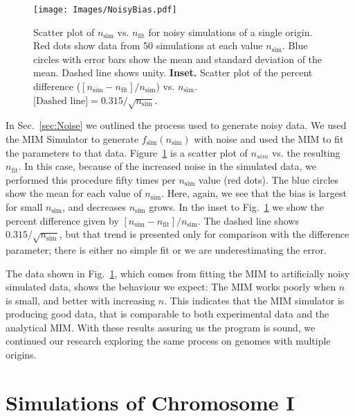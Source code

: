 		\begin{figure}[tbh]
			\begin{center}
				\texttt{[image: Images/NoisyBias.pdf]}
			\end{center}
				\caption[Bias in MIM Fit to Noisy Data]{\label{fig:NoisyBias} Scatter plot of $n_\text{sim}$ vs. $n_\text{fit}$ for noisy simulations of a single origin.
				Red dots show data from 50 simulations at each value $n_\text{sim}$.
				Blue circles with error bars show the mean and standard deviation of the mean.
				Dashed line shows unity.
				\textbf{Inset.} Scatter plot of the percent difference ($[n_\text{sim} - n_\text{fit}]/n_\text{sim}$) vs. $n_\text{sim}$.\\
				$\text{[Dashed line]} = 0.315/\sqrt{n_\text{sim}}$.
				}
		\end{figure}
		
		In Sec.~\ref{sec:Noise} we outlined the process used to generate noisy data.
		We used the MIM Simulator to generate $f_\text{sim}(n_\text{sim})$ with noise and used the MIM to fit the parameters to that data.
		Figure~\ref{fig:NoisyBias} is a scatter plot of $n_{sim}$ vs. the resulting $n_\text{fit}$.
		In this case, because of the increased noise in the simulated data, we performed this procedure fifty times per $n_\text{sim}$ value (red dots).
		The blue circles show the mean for each value of $n_\text{sim}$.
		Here, again, we see that the bias is largest for small $n_\text{sim}$, and decreases $n_\text{sim}$ grows.
		In the inset to Fig.~\ref{fig:NoisyBias} we show the percent difference given by $[n_\text{sim} - n_\text{fit}]/n_\text{sim}$.
		The dashed line shows $0.315/\sqrt{n_\text{sim}}$, but that trend is presented only for comparison with the difference parameter; there is either no simple fit or we are underestimating the error.
		
		The data shown in Fig.~\ref{fig:NoisyBias}, which comes from fitting the MIM to artificially noisy simulated data, shows the behaviour we expect:
		The MIM works poorly when $n$ is small, and better with increasing $n$.
		This indicates that the MIM simulator is producing good data, that is comparable to both experimental data and the analytical MIM.
		With these results assuring us the program is sound, we continued our research exploring the same process on genomes with multiple origins.
		
		
	\section{Simulations of Chromosome I}
	\label{sec:ChromosomeI}
	
